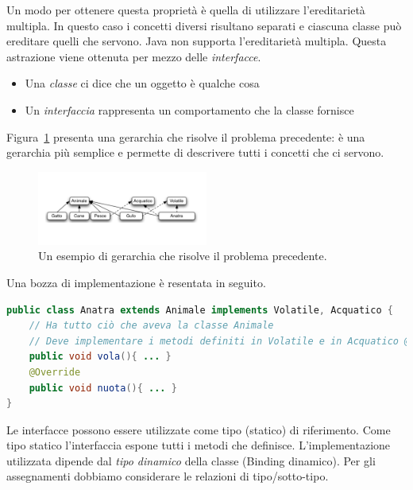 \documentclass{article}
\begin{document}
Un modo per ottenere questa propriet\`a \`e quella di utilizzare l'ereditariet\`a multipla. In questo caso i concetti diversi risultano separati e ciascuna classe pu\`o ereditare quelli che servono. Java non supporta l'ereditariet\`a multipla. Questa astrazione viene ottenuta per mezzo delle \emph{interfacce}.

\begin{itemize}
\item Una \emph{classe} ci dice che un oggetto \`e qualche cosa
\item Un \emph{interfaccia} rappresenta un comportamento che la classe fornisce
\end{itemize}

Figura~\ref{Fig:gerarchy4} presenta una gerarchia che risolve il problema precedente: \`e una gerarchia pi\`u semplice e permette di descrivere tutti i concetti che ci servono.
\begin{figure}[h!]
  \centering
    \includegraphics[width=0.5\textwidth]{gerarchia4.pdf}
      \caption{Un esempio di gerarchia che risolve il problema precedente.}
      \label{Fig:gerarchy4}
\end{figure}

Una bozza di implementazione \`e resentata in seguito.
\begin{lstlisting}[language=Java,escapechar=|]
public class Anatra extends Animale implements Volatile, Acquatico { 
    // Ha tutto ciò che aveva la classe Animale
    // Deve implementare i metodi definiti in Volatile e in Acquatico @Override
    public void vola(){ ... }
    @Override
    public void nuota(){ ... } 
}
\end{lstlisting}
Le interfacce possono essere utilizzate come tipo (statico) di riferimento. Come tipo statico l'interfaccia espone tutti i metodi che definisce.
L'implementazione utilizzata dipende dal \emph{tipo dinamico} della classe (Binding dinamico). Per gli assegnamenti dobbiamo considerare le relazioni di tipo/sotto-tipo.
\end{document}
